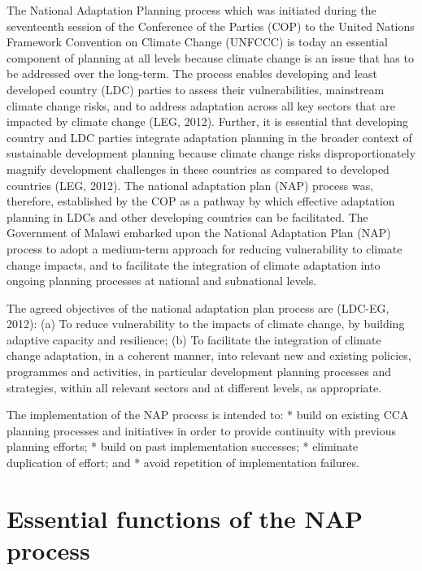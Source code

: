 \documentclass[
]{book}
\begin{document}
The National Adaptation Planning process which was initiated during the seventeenth session of the Conference of the Parties (COP) to the United Nations Framework Convention on Climate Change (UNFCCC) is today an essential component of planning at all levels because climate change is an issue that has to be addressed over the long-term. The process enables developing and least developed country (LDC) parties to assess their vulnerabilities, mainstream climate change risks, and to address adaptation across all key sectors that are impacted by climate change (LEG, 2012). Further, it is essential that developing country and LDC parties integrate adaptation planning in the broader context of sustainable development planning because climate change risks disproportionately magnify development challenges in these countries as compared to developed countries (LEG, 2012). The national adaptation plan (NAP) process was, therefore, established by the COP as a pathway by which effective adaptation planning in LDCs and other developing countries can be facilitated. The Government of Malawi embarked upon the National Adaptation Plan (NAP) process to adopt a medium-term approach for reducing vulnerability to climate change impacts, and to facilitate the integration of climate adaptation into ongoing planning processes at national and subnational levels.

The agreed objectives of the national adaptation plan process are (LDC-EG, 2012): (a) To reduce vulnerability to the impacts of climate change, by building adaptive capacity and resilience; (b) To facilitate the integration of climate change adaptation, in a coherent manner, into relevant new and existing policies, programmes and activities, in particular development planning processes and strategies, within all relevant sectors and at different levels, as appropriate.

The implementation of the NAP process is intended to:
* build on existing CCA planning processes and initiatives in order to provide continuity with previous planning efforts;
* build on past implementation successes;
* eliminate duplication of effort; and
* avoid repetition of implementation failures.

\hypertarget{essential-functions-of-the-nap-process}{%
\section{Essential functions of the NAP process}\label{essential-functions-of-the-nap-process}}
\end{document}
